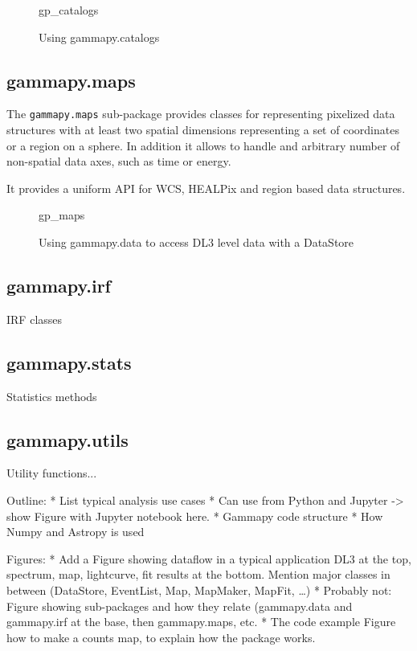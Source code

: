 \begin{figure}
	{gp_catalogs}
	\caption{Using gammapy.catalogs}
	\label{codeexample:data}
\end{figure}

\subsection{gammapy.maps}
\label{ssec:gammapy-maps}
The \verb|gammapy.maps| sub-package provides classes for representing pixelized
data structures with at least two spatial dimensions representing a set of
coordinates or a region on a sphere. In addition it allows to handle and
arbitrary number of non-spatial data axes, such as time or energy.

It provides a uniform API for WCS, HEALPix and region based data structures.

\begin{figure}
	{gp_maps}
	\caption{Using gammapy.data to access DL3 level data with a DataStore}
	\label{codeexample:data}
\end{figure}

\subsection{gammapy.irf}
\label{ssec:gammapy-irf}
IRF classes

\subsection{gammapy.stats}
\label{ssec:gammapy-stats}
Statistics methods

\subsection{gammapy.utils}
\label{ssec:gammapy-utils}
Utility functions...

Outline: * List typical analysis use cases * Can use from Python and Jupyter ->
show Figure with Jupyter notebook here. * Gammapy code structure * How Numpy
and Astropy is used

Figures: * Add a Figure showing dataflow in a typical application DL3 at the
top, spectrum, map, lightcurve, fit results at the bottom. Mention major
classes in between (DataStore, EventList, Map, MapMaker, MapFit, …) * Probably
not: Figure showing sub-packages and how they relate (gammapy.data and
gammapy.irf at the base, then gammapy.maps, etc. * The code example Figure how
to make a counts map, to explain how the package works.
